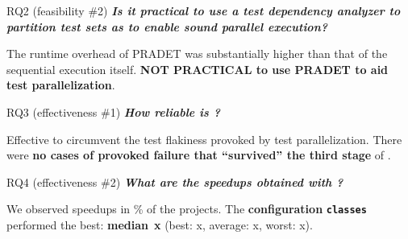 \documentclass{beamer}
\begin{document}
\begin{frame}{RQ2 (feasibility \#2)}
	\textbf{\textit{Is it {\rsm practical to use a test dependency analyzer} to partition test sets as to enable {\rsm sound} parallel execution?}}\pause
	\begin{center}
		\begin{tcolorbox}
			The runtime overhead of PRADET was substantially higher than that of the sequential execution itself. \textbf{\color{red} NOT PRACTICAL to use PRADET to aid test parallelization}.
		\end{tcolorbox}
	\end{center}
\end{frame}

\begin{frame}{RQ3 (effectiveness \#1)}
	\textbf{\textit{How {\rsm reliable} is \tname?}}
	\begin{center}\pause
		\begin{tcolorbox}
			Effective to circumvent the test flakiness provoked by test parallelization. There were \textbf{\color{red}no cases of provoked failure that ``survived'' the third stage} of \tname.
		\end{tcolorbox}
	\end{center}
\end{frame}

\begin{frame}{RQ4 (effectiveness \#2)}
	\textbf{\textit{What are the {\rsm speedups obtained} with \tname?}}
	\begin{center}\pause
		\begin{tcolorbox}
			We observed speedups in \FrequencySpeedups\% of the projects. The {\color{red}\textbf{configuration} \texttt{\textbf{classes}}} performed the best: {\color{red} \textbf{median}~\textbf{\SpeedupClassesMedian{}x}} (best: \SpeedupClassesMax{}x, average: \SpeedupClassesAvg{}x, worst: \SpeedupClassesMin{}x).
		\end{tcolorbox}
	\end{center}
\end{frame}
\end{document}

